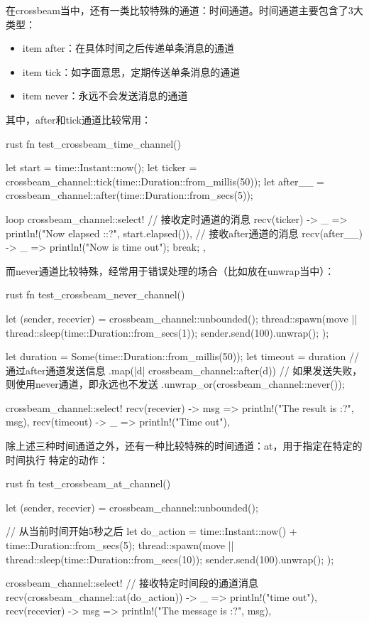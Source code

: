 在crossbeam当中，还有一类比较特殊的通道：时间通道。时间通道主要包含了3大类型：
\begin{itemize}
  \item{item} after：在具体时间之后传递单条消息的通道
  \item{item} tick：如字面意思，定期传送单条消息的通道
  \item{item} never：永远不会发送消息的通道
\end{itemize}

其中，after和tick通道比较常用：
\begin{code-block}{rust}
fn test_crossbeam_time_channel() {
    let start = time::Instant::now();
    let ticker = crossbeam_channel::tick(time::Duration::from_millis(50));
    let after__ = crossbeam_channel::after(time::Duration::from_secs(5));

    loop {
        crossbeam_channel::select! {
            // 接收定时通道的消息
            recv(ticker) -> _ => println!("Now elapsed :{:?}", start.elapsed()),
            // 接收after通道的消息
            recv(after__) -> _ => {
                println!("Now is time out");
                break;
            },
        }
    }
}
\end{code-block}

而never通道比较特殊，经常用于错误处理的场合（比如放在unwrap当中）：
\begin{code-block}{rust}
fn test_crossbeam_never_channel() {
    let (sender, recevier) = crossbeam_channel::unbounded();
    thread::spawn(move || {
        thread::sleep(time::Duration::from_secs(1));
        sender.send(100).unwrap();
    });

    let duration = Some(time::Duration::from_millis(50));
    let timeout = duration
        // 通过after通道发送信息
        .map(|d| crossbeam_channel::after(d))
        // 如果发送失败，则使用never通道，即永远也不发送
        .unwrap_or(crossbeam_channel::never());

    crossbeam_channel::select! {
        recv(recevier) -> msg => println!("The result is {:?}", msg),
        recv(timeout) -> _ => println!("Time out"),
    }
}
\end{code-block}

除上述三种时间通道之外，还有一种比较特殊的时间通道：at，用于指定在特定的时间执行
特定的动作：
\begin{code-block}{rust}
fn test_crossbeam_at_channel() {
    let (sender, recevier) = crossbeam_channel::unbounded();

    // 从当前时间开始5秒之后
    let do_action = time::Instant::now() + time::Duration::from_secs(5);
    thread::spawn(move || {
        thread::sleep(time::Duration::from_secs(10));
        sender.send(100).unwrap();
    });

    crossbeam_channel::select! {
        // 接收特定时间段的通道消息
        recv(crossbeam_channel::at(do_action)) -> _ => println!("time out"),
        recv(recevier) -> msg => println!("The message is {:?}", msg),
    }
}
\end{code-block}

